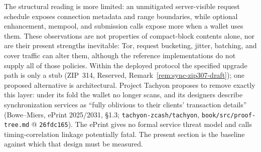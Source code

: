 \documentclass[11pt,a4paper]{article}
\theoremstyle{definition}
\begin{document}
The structural reading is more limited: an unmitigated server-visible
request schedule exposes connection metadata and range boundaries, while
optional enhancement, mempool, and submission calls expose more when a
wallet uses them. These observations are not properties of compact-block
contents alone, nor are their present strengths inevitable: Tor, request
bucketing, jitter, batching, and cover traffic can alter them, although the
reference implementations do not supply all of those policies. Within the
deployed protocol the specified upgrade path is only a stub (ZIP~314,
Reserved, Remark~\ref{rem:sync-zip307-draft}); one proposed alternative is
architectural.
Project Tachyon proposes to remove exactly this layer: under its fold the
wallet no longer scans, and its designers describe synchronization services as
``fully oblivious to their clients' transaction details'' (Bowe--Miers, ePrint
2025/2031, \S1.3; \texttt{tachyon-zcash/tachyon},
\texttt{book/src/proof-tree.md} @ \texttt{26fdc165}). The ePrint gives no
formal service threat model and calls timing-correlation linkage potentially
fatal. The present section is the baseline against which that design must be
measured.
\end{document}
